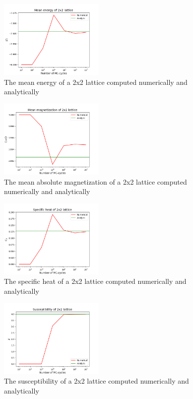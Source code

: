 \documentclass[notitlepage, reprint, nofootinbib]{revtex4-1}
\begin{document}
\begin{figure} %
	\centering
	\includegraphics[width=0.45\textwidth]{../Figures/E_mean_4b.png}
	\caption{The mean energy of a 2x2 lattice computed numerically and analytically}
	\label{fig1}
\end{figure}

\begin{figure} %
	\centering
	\includegraphics[width=0.45\textwidth]{../Figures/M_mean_4b.png}
	\caption{The mean absolute magnetization of a 2x2 lattice computed numerically and analytically}
	\label{fig2}
\end{figure}

\begin{figure} %
	\centering
	\includegraphics[width=0.45\textwidth]{../Figures/C_V_4b.png}
	\caption{The specific heat of a 2x2 lattice computed numerically and analytically}
	\label{fig3}
\end{figure}

\begin{figure} %
	\centering
	\includegraphics[width=0.45\textwidth]{../Figures/chi_4b.png}
	\caption{The susceptibility of a 2x2 lattice computed numerically and analytically}
	\label{fig4}
\end{figure}
\end{document}
